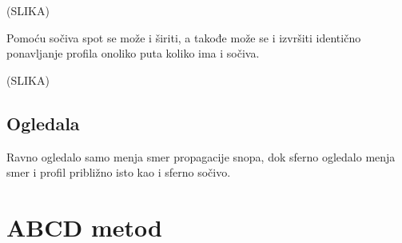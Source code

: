 \documentclass[fleqn]{report}
\begin{document}
(SLIKA)

Pomoću sočiva spot se može i širiti, a takođe može se i izvršiti identično ponavljanje profila onoliko puta koliko ima i sočiva.

(SLIKA)

\subsection{Ogledala}

Ravno ogledalo samo menja smer propagacije snopa, dok sferno ogledalo menja smer i profil približno isto kao i sferno sočivo.

\section{ABCD metod}
\end{document}
